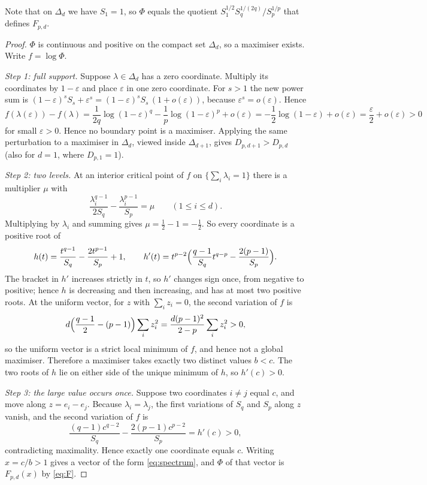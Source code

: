 \documentclass[11pt,a4paper]{article}
\numberwithin{equation}{section}
\theoremstyle{definition}
\theoremstyle{remark}
\begin{document}
Note that on \(\Delta_d\) we have \(S_1=1\), so \(\Phi\) equals the
quotient \(S_1^{1/2}S_q^{1/(2q)}/S_p^{1/p}\) that defines \(F_{p,d}\).

\begin{proof}
\(\Phi\) is continuous and positive on the compact set \(\Delta_d\), so
a maximiser exists. Write \(f=\log\Phi\).

\emph{Step 1: full support.} Suppose \(\lambda\in\Delta_d\) has a zero
coordinate. Multiply its coordinates by \(1-\varepsilon\) and place
\(\varepsilon\) in one zero coordinate. For \(s>1\) the new power sum is
\((1-\varepsilon)^sS_s+\varepsilon^s=(1-\varepsilon)^sS_s\,(1+o(\varepsilon))\), because
\(\varepsilon^s=o(\varepsilon)\). Hence
\[
 f(\lambda(\varepsilon))-f(\lambda)
 =\frac{1}{2q}\log(1-\varepsilon)^q-\frac1p\log(1-\varepsilon)^p+o(\varepsilon)
 =-\frac12\log(1-\varepsilon)+o(\varepsilon)=\frac{\varepsilon}{2}+o(\varepsilon)>0
\]
for small \(\varepsilon>0\). Hence no boundary point is a
maximiser. Applying the same perturbation to a maximiser in
\(\Delta_d\), viewed inside \(\Delta_{d+1}\), gives
\(D_{p,d+1}>D_{p,d}\) (also for \(d=1\), where \(D_{p,1}=1\)).

\emph{Step 2: two levels.} At an interior critical point of \(f\) on
\(\{\sum_i\lambda_i=1\}\) there is a multiplier \(\mu\) with
\[
 \frac{\lambda_i^{q-1}}{2S_q}-\frac{\lambda_i^{p-1}}{S_p}=\mu
 \qquad(1\le i\le d).
\]
Multiplying by \(\lambda_i\) and summing gives \(\mu=\frac12-1=-\frac12\).
So every coordinate is a positive root of
\begin{equation}\label{eq:h}
 h(t)=\frac{t^{q-1}}{S_q}-\frac{2t^{p-1}}{S_p}+1,
 \qquad
 h'(t)=t^{p-2}\Bigl(\frac{q-1}{S_q}t^{q-p}-\frac{2(p-1)}{S_p}\Bigr).
\end{equation}
The bracket in \(h'\) increases strictly in \(t\), so \(h'\) changes
sign once, from negative to positive; hence \(h\) is decreasing and then
increasing, and has at most two positive roots. At the uniform vector,
for \(z\) with \(\sum_iz_i=0\), the second variation of \(f\) is
\[
 d\Bigl(\frac{q-1}{2}-(p-1)\Bigr)\sum_iz_i^2
 =\frac{d(p-1)^2}{2-p}\sum_iz_i^2>0,
\]
so the uniform vector is a strict local minimum of \(f\), and hence not
a global maximiser. Therefore a maximiser takes exactly two distinct
values \(b<c\). The two roots of \(h\) lie on either side of the unique
minimum of \(h\), so \(h'(c)>0\).

\emph{Step 3: the large value occurs once.} Suppose two coordinates
\(i\ne j\) equal \(c\), and move along \(z=e_i-e_j\). Because
\(\lambda_i=\lambda_j\), the first variations of \(S_q\) and \(S_p\)
along \(z\) vanish, and the second variation of \(f\) is
\[
 \frac{(q-1)c^{q-2}}{S_q}-\frac{2(p-1)c^{p-2}}{S_p}=h'(c)>0,
\]
contradicting maximality. Hence exactly one coordinate equals \(c\).
Writing \(x=c/b>1\) gives a vector of the form \eqref{eq:spectrum}, and
\(\Phi\) of that vector is \(F_{p,d}(x)\) by \eqref{eq:F}.


\end{proof}
\end{document}
